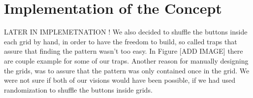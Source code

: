 \section{Implementation of the Concept}









LATER IN IMPLEMETNATION ! 
We also decided to shuffle the buttons inside each grid by hand, in order to have the freedom to build, so called traps that assure that finding the pattern wasn't too easy. In Figure [ADD IMAGE] there are couple example for some of our traps. Another reason for manually designing the grids, was to assure that the pattern was only contained once in the grid. We were not sure if both of our visions would have been possible, if we had used randomization to shuffle the buttons inside grids. 


